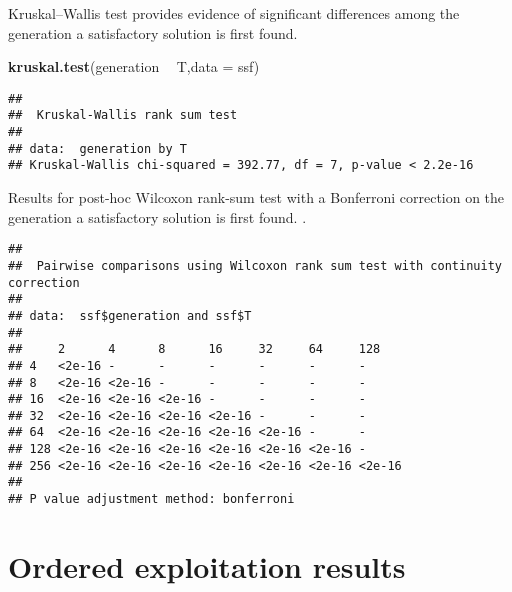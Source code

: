 \documentclass[]{book}
\newenvironment{Shaded}{\begin{snugshade}}{\end{snugshade}}
\newcommand{\DataTypeTok}[1]{\textcolor[rgb]{0.13,0.29,0.53}{#1}}
\newcommand{\KeywordTok}[1]{\textcolor[rgb]{0.13,0.29,0.53}{\textbf{#1}}}
\newcommand{\NormalTok}[1]{#1}
\newcommand{\OperatorTok}[1]{\textcolor[rgb]{0.81,0.36,0.00}{\textbf{#1}}}
\newcommand{\OtherTok}[1]{\textcolor[rgb]{0.56,0.35,0.01}{#1}}
\newcommand{\StringTok}[1]{\textcolor[rgb]{0.31,0.60,0.02}{#1}}
\begin{document}
Kruskal--Wallis test provides evidence of significant differences among the generation a satisfactory solution is first found.

\begin{Shaded}
\begin{Highlighting}[]
\KeywordTok{kruskal.test}\NormalTok{(generation }\OperatorTok{~}\StringTok{ }\NormalTok{T,}\DataTypeTok{data =}\NormalTok{ ssf)}
\end{Highlighting}
\end{Shaded}

\begin{verbatim}
## 
##  Kruskal-Wallis rank sum test
## 
## data:  generation by T
## Kruskal-Wallis chi-squared = 392.77, df = 7, p-value < 2.2e-16
\end{verbatim}

Results for post-hoc Wilcoxon rank-sum test with a Bonferroni correction on the generation a satisfactory solution is first found. .

\begin{Shaded}
\end{Shaded}

\begin{verbatim}
## 
##  Pairwise comparisons using Wilcoxon rank sum test with continuity correction 
## 
## data:  ssf$generation and ssf$T 
## 
##     2      4      8      16     32     64     128   
## 4   <2e-16 -      -      -      -      -      -     
## 8   <2e-16 <2e-16 -      -      -      -      -     
## 16  <2e-16 <2e-16 <2e-16 -      -      -      -     
## 32  <2e-16 <2e-16 <2e-16 <2e-16 -      -      -     
## 64  <2e-16 <2e-16 <2e-16 <2e-16 <2e-16 -      -     
## 128 <2e-16 <2e-16 <2e-16 <2e-16 <2e-16 <2e-16 -     
## 256 <2e-16 <2e-16 <2e-16 <2e-16 <2e-16 <2e-16 <2e-16
## 
## P value adjustment method: bonferroni
\end{verbatim}

\hypertarget{ordered-exploitation-results-2}{%
\section{Ordered exploitation results}\label{ordered-exploitation-results-2}}
\end{document}

